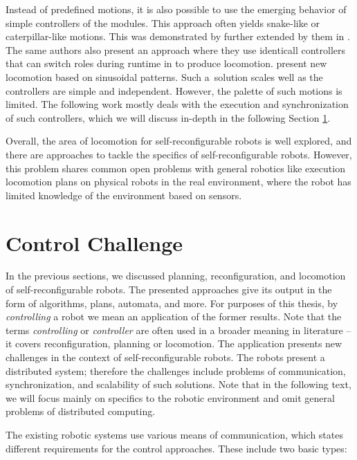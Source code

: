 Instead of predefined motions, it is also possible to use the emerging behavior
of simple controllers of the modules. This approach often yields snake-like or
caterpillar-like motions. This was demonstrated by \textcite{stoy2002global}
further extended by them in \cite{DBLP:conf/icra/StoySW03}. The same authors
also present an approach where they use identicall controllers that can switch
roles during runtime in \cite{1159219} to produce locomotion.
\textcite{gonzalez2006locomotion} present new locomotion based on sinusoidal
patterns. Such a~solution scales well as the controllers are simple and
independent. However, the palette of such motions is limited. The following work
mostly deals with the execution and synchronization of such controllers, which
we will discuss in-depth in the following Section \ref{sec:chal-control}.

Overall, the area of locomotion for self-reconfigurable robots is well explored,
and there are approaches to tackle the specifics of self-reconfigurable robots.
However, this problem shares common open problems with general robotics like
execution locomotion plans on physical robots in the real environment, where the
robot has limited knowledge of the environment based on sensors.

\section{Control Challenge}\label{sec:chal-control}

In the previous sections, we discussed planning, reconfiguration, and locomotion
of self-reconfigurable robots. The presented approaches give its output in the
form of algorithms, plans, automata, and more. For purposes of this thesis, by
\emph{controlling} a robot we mean an application of the former results. Note
that the terms \emph{controlling} or \emph{controller} are often used in a
broader meaning in literature -- it covers reconfiguration, planning or
locomotion. The application presents new challenges in the context of
self-reconfigurable robots. The robots present a distributed system; therefore
the challenges include problems of communication, synchronization, and
scalability of such solutions. Note that in the following text, we will focus
mainly on specifics to the robotic environment and omit general problems of
distributed computing.

The existing robotic systems use various means of communication, which states
different requirements for the control approaches. These include two basic
types:

